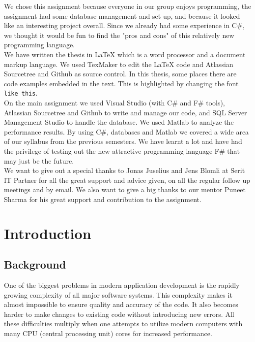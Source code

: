 \documentclass[12pt, a4paper]{article}
\newcommand{\code}[1]{{\small \texttt{#1}}}
\begin{document}
We chose this assignment because everyone in our group enjoys programming, the assignment had some database management and set up, and because it looked like an interesting project overall. Since we already had some experience in C\#, we thought it would be fun to find the "pros and cons" of this relatively new programming language.\\

We have written the thesis in LaTeX which is a word processor and a document markup language. We used TexMaker to edit the LaTeX code and Atlassian Sourcetree and Github as source control. 
In this thesis, some places there are code examples embedded in the text. This is highlighted by changing the font \code{like this}.\\

On the main assignment we used Visual Studio (with C\# and F\# tools), Atlassian Sourcetree and Github to write and manage our code, and SQL Server Management Studio to handle the database. We used Matlab to analyze the performance results. By using C\#, databases and Matlab we covered a wide area of our syllabus from the previous semesters. We have learnt a lot and have had the privilege of testing out the new attractive programming language F\# that may just be the future. \\

We want to give out a special thanks to Jonas Juselius and Jens Blomli at Serit IT Partner for all the great support and advice given, on all the regular follow up meetings and by email. We also want to give a big thanks to our mentor Puneet Sharma for his great support and contribution to the assignment.\\

\newpage
\tableofcontents

\newpage
\section{Introduction}
\subsection{Background}
One of the biggest problems in modern application development is the rapidly growing complexity of all major software systems. This complexity makes it almost impossible to ensure quality and accuracy of the code. It also becomes harder to make changes to existing code without introducing new errors. All these difficulties multiply when one attempts to utilize modern computers with many CPU (central processing unit) cores for increased performance.\\
\end{document}

